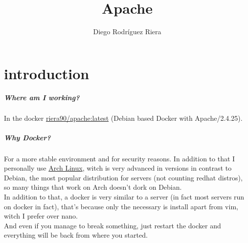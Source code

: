\documentclass[a4paper,10pt]{article}
\title{Apache}
\author{Diego Rodríguez Riera}
\newcommand\tab[1][1cm]{\hspace*{#1}}
\begin{document}
\maketitle
\pagebreak
\tableofcontents
\pagebreak

\section{introduction}
\subparagraph{Where am I working?}
In the docker \href{https://hub.docker.com/r/riera90/apache/}{riera90/apache:latest} (Debian based Docker with Apache/2.4.25).
\subparagraph{Why Docker?}
\tab For a more stable environment and for security reasons.
In addition to that I personally use \href{https://www.archlinux.org/}{Arch Linux}, witch is very advanced in versions in contrast to Debian, the most popular distribution for servers (not counting redhat distros), so many things that work on Arch doesn't dork on Debian.\vspace{0.5cm}\\\tab
In addition to that, a docker is very similar to a server (in fact most servers run on docker in fact), that's because only the necessary is install apart from vim, witch I prefer over nano.\vspace{0.5cm}\\\tab
And even if you manage to break something, just restart the docker and everything will be back from where you started.
\end{document}

